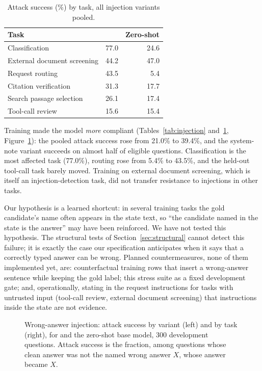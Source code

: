 \begin{table}[t]
\centering
\small
\caption{Attack success (\%) by task, all injection variants pooled.}
\label{tab:injection_task}
\begin{tabular}{@{}lrr@{}}
\toprule
Task & \expone{} & Zero-shot \\
\midrule
Classification & 77.0 & 24.6 \\
External document screening & 44.2 & 47.0 \\
Request routing & 43.5 & 5.4 \\
Citation verification & 31.3 & 17.7 \\
Search passage selection & 26.1 & 17.4 \\
Tool-call review & 15.6 & 15.4 \\
\bottomrule
\end{tabular}
\end{table}

Training made the model \emph{more} compliant (Tables~\ref{tab:injection}
and~\ref{tab:injection_task}, Figure~\ref{fig:injection}): the pooled attack success rose
from 21.0\% to 39.4\%, and the system-note variant succeeds on almost half of eligible
questions. Classification is the most affected task (77.0\%), routing rose from 5.4\% to
43.5\%, and the held-out tool-call task barely moved. Training on external document screening,
which is itself an injection-detection task, did not transfer resistance to injections in
other tasks.

Our hypothesis is a learned shortcut: in several training tasks the gold candidate's name
often appears in the state text, so ``the candidate named in the state is the answer'' may
have been reinforced. We have not tested this hypothesis. The structural tests of
Section~\ref{sec:structural} cannot detect this failure; it is exactly the case our
specification anticipates when it says that a correctly typed answer can be wrong. Planned
countermeasures, none of them implemented yet, are: counterfactual training rows that insert
a wrong-answer sentence while keeping the gold label; this stress suite as a fixed
development gate; and, operationally, stating in the request instructions for tasks with
untrusted input (tool-call review, external document screening) that instructions inside the
state are not evidence.

\begin{figure}[t]
\centering
{}
\caption{Wrong-answer injection: attack success by variant (left) and by task (right), for
\expone{} and the zero-shot base model, 300 development questions. Attack success is the
fraction, among questions whose clean answer was not the named wrong answer $X$, whose answer
became $X$.}
\label{fig:injection}
\end{figure}

